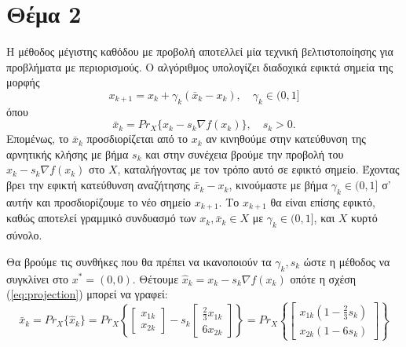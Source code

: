 \documentclass[a4paper,12pt]{article}
\begin{document}
\section*{Θέμα 2}
Η μέθοδος μέγιστης καθόδου με προβολή αποτελλεί μία τεχνική βελτιστοποίησης για προβλήματα με περιορισμούς.
Ο αλγόριθμος υπολογίζει διαδοχικά εφικτά σημεία της μορφής
\begin{equation}
    x_{k+1} = x_k + \gamma_k (\bar{x}_k - x_k), \quad \gamma_k \in (0, 1]
    \label{eq:projected_steepest_descend}
\end{equation}
όπου
\begin{equation}
    \bar{x}_k = Pr_X\{x_k - s_k \nabla f(x_k)\}, \quad s_k > 0.
    \label{eq:projection}
\end{equation}
Επομένως, το $\bar{x}_k$ προσδιορίζεται από το $x_k$ αν κινηθούμε στην κατεύθυνση της αρνητικής κλήσης με
βήμα $s_k$ και στην συνέχεια βρούμε την προβολή του $x_k - s_k \nabla f(x_k)$ στο $X$, καταλήγοντας με τον
τρόπο αυτό σε εφικτό σημείο. Έχοντας βρει την εφικτή κατεύθυνση αναζήτησης $\bar{x}_k - x_k$, κινούμαστε με
βήμα $\gamma_k \in (0, 1]$ σ' αυτήν και προσδιορίζουμε το νέο σημείο $x_{k+1}$. Το \(x_{k+1}\) θα είναι 
επίσης εφικτό, καθώς αποτελεί γραμμικό συνδυασμό των $x_k, \bar{x}_k \in X$ με $\gamma_k \in (0, 1]$, 
και $X$ κυρτό σύνολο.

Θα βρούμε τις συνθήκες που θα πρέπει να ικανοποιούν τα $\gamma_k, s_k$ ώστε η μέθοδος να συγκλίνει στο 
$x^* = (0, 0)$. Θέτουμε $\hat{x}_k = x_k - s_k \nabla f(x_k)$ οπότε η σχέση (\ref{eq:projection}) μπορεί να γραφεί:
\begin{equation}
    \bar{x}_k = Pr_X\{\hat{x}_k\} = Pr_X\left\{\begin{bmatrix} x_{1k} \\ x_{2k} \end{bmatrix} - 
    s_k \begin{bmatrix} \frac{2}{3} x_{1k} \\ 6 x_{2k} \end{bmatrix}\right\} = 
    Pr_X\left\{\begin{bmatrix} x_{1k} \left(1 - \frac{2}{3} s_k\right) \\ x_{2k} (1 - 6 s_k)\end{bmatrix} \right\}
\end{equation}
\end{document}
